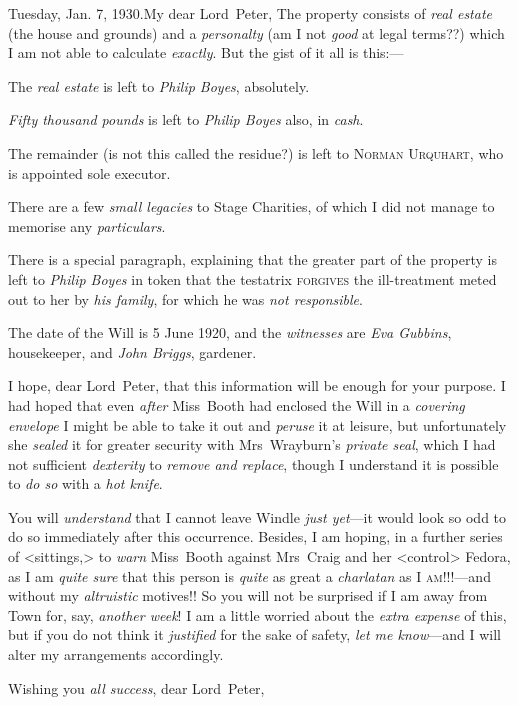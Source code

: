 \begin{mail}{Tuesday, Jan. 7, 1930.}{My dear Lord~Peter,}
The property consists of \emph{real estate} (the house and grounds) and a \emph{personalty} (am I not \emph{good} at legal terms??) which I am not able to calculate \emph{exactly}. But the gist of it all is this:—

The \emph{real estate} is left to \emph{Philip Boyes}, absolutely.

\emph{Fifty thousand pounds} is left to \emph{Philip Boyes} also, in \emph{cash}.

The remainder (is not this called the residue?) is left to \textsc{Norman Urquhart}, who is appointed sole executor.

There are a few \emph{small legacies} to Stage Charities, of which I did not manage to memorise any \emph{particulars}.

There is a special paragraph, explaining that the greater part of the property is left to \emph{Philip Boyes} in token that the testatrix \textsc{forgives} the ill-treatment meted out to her by \emph{his family}, for which he was \emph{not responsible}.

The date of the Will is 5 June 1920, and the \emph{witnesses} are \emph{Eva Gubbins}, housekeeper, and \emph{John Briggs}, gardener.

I hope, dear Lord~Peter, that this information will be enough for your purpose. I had hoped that even \emph{after} Miss~Booth had enclosed the Will in a \emph{covering envelope} I might be able to take it out and \emph{peruse} it at leisure, but unfortunately she \emph{sealed} it for greater security with Mrs~Wrayburn's \emph{private seal}, which I had not sufficient \emph{dexterity} to \emph{remove and replace}, though I understand it is possible to \emph{do so} with a \emph{hot knife}.

You will \emph{understand} that I cannot leave Windle \emph{just yet}—it would look so odd to do so immediately after this occurrence. Besides, I am hoping, in a further series of <sittings,> to \emph{warn} Miss~Booth against Mrs~Craig and her <control> Fedora, as I am \emph{quite sure} that this person is \emph{quite} as great a \emph{charlatan} as I \textsc{am}!!!—and without my \emph{altruistic} motives!! So you will not be surprised if I am away from Town for, say, \emph{another week}! I am a little worried about the \emph{extra expense} of this, but if you do not think it \emph{justified} for the sake of safety, \emph{let me know}—and I will alter my arrangements accordingly.

Wishing you \emph{all success}, dear Lord~Peter,


\end{mail}

